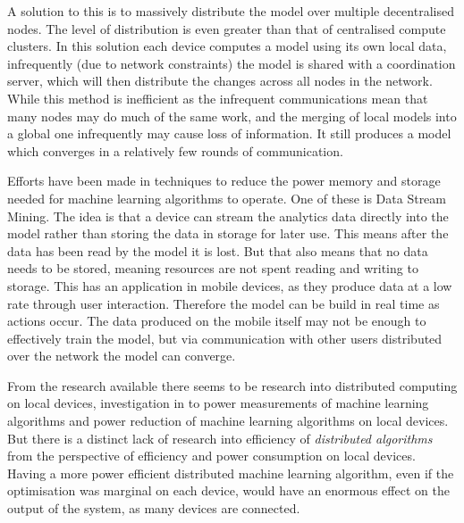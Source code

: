 A solution to this is to massively distribute the model over multiple
decentralised nodes. The level of distribution is even greater than that of
centralised compute clusters. In this solution each device computes a model
using its own local data, infrequently (due to network constraints) the model is
shared with a coordination server, which will then distribute the changes across
all nodes in the network. \cite{wang2018EdgeLearning} While this method is
inefficient as the infrequent communications mean that many nodes may do much of
the same work, and the merging of local models into a global one infrequently
may cause loss of information. It still produces a model which converges in a
relatively few rounds of communication. \cite{konevcny2016federated}

Efforts have been made in techniques to reduce the power memory and storage
needed for machine learning algorithms to operate. One of these is Data Stream
Mining. The idea is that a device can stream the analytics data directly into
the model rather than storing the data in storage for later use.
\cite{garciaMartin2019MLEnergy} This means after the data has been read by the
model it is lost. But that also means that no data needs to be stored, meaning
resources are not spent reading and writing to storage. This has an application
in mobile devices, as they produce data at a low rate through user interaction.
Therefore the model can be build in real time as actions occur. The data
produced on the mobile itself may not be enough to effectively train the model,
but via communication with other users distributed over the network the model
can converge. \cite{konevcny2016federated}

From the research available there seems to be research into distributed
computing on local devices, investigation in to power measurements of machine
learning algorithms \cite{wang2018EdgeLearning, konevcny2016federated} and
power reduction of machine learning algorithms on local devices.
\cite{garciaMartin2019MLEnergy} But there is a distinct lack of research into
efficiency of \textit{distributed algorithms} from the perspective of efficiency
and power consumption on local devices. Having a more power efficient
distributed machine learning algorithm, even if the optimisation was marginal on
each device, would have an enormous effect on the output of the system, as many
devices are connected.

